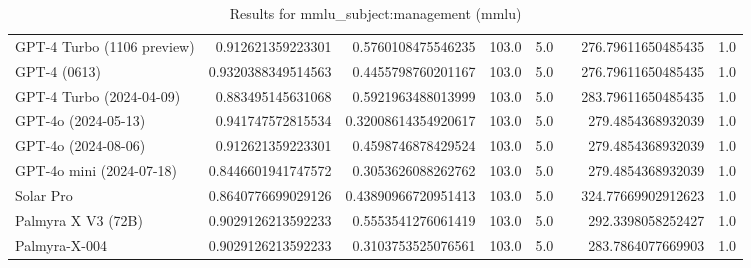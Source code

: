 \begin{table}[htp]
{\begin{tabular}{lrrrrrrr}
GPT-4 Turbo (1106 preview) & 0.912621359223301 & 0.5760108475546235 & 103.0 & 5.0 &  & 276.79611650485435 & 1.0 \\
GPT-4 (0613) & 0.9320388349514563 & 0.4455798760201167 & 103.0 & 5.0 &  & 276.79611650485435 & 1.0 \\
GPT-4 Turbo (2024-04-09) & 0.883495145631068 & 0.5921963488013999 & 103.0 & 5.0 &  & 283.79611650485435 & 1.0 \\
GPT-4o (2024-05-13) & 0.941747572815534 & 0.32008614354920617 & 103.0 & 5.0 &  & 279.4854368932039 & 1.0 \\
GPT-4o (2024-08-06) & 0.912621359223301 & 0.4598746878429524 & 103.0 & 5.0 &  & 279.4854368932039 & 1.0 \\
GPT-4o mini (2024-07-18) & 0.8446601941747572 & 0.3053626088262762 & 103.0 & 5.0 &  & 279.4854368932039 & 1.0 \\
Solar Pro & 0.8640776699029126 & 0.43890966720951413 & 103.0 & 5.0 &  & 324.77669902912623 & 1.0 \\
Palmyra X V3 (72B) & 0.9029126213592233 & 0.5553541276061419 & 103.0 & 5.0 &  & 292.3398058252427 & 1.0 \\
Palmyra-X-004 & 0.9029126213592233 & 0.3103753525076561 & 103.0 & 5.0 &  & 283.7864077669903 & 1.0 \\
\bottomrule
\end{tabular}}
\caption{Results for mmlu_subject:management (mmlu)}
\label{fig:mmlu_subject:management (mmlu)}
\end{table}